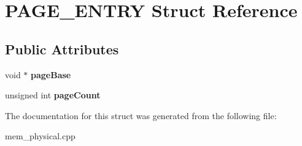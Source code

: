 \hypertarget{struct_p_a_g_e___e_n_t_r_y}{}\section{P\+A\+G\+E\+\_\+\+E\+N\+T\+RY Struct Reference}
\label{struct_p_a_g_e___e_n_t_r_y}
\subsection*{Public Attributes}
\begin{DoxyCompactItemize}
\item 
\mbox{\label{struct_p_a_g_e___e_n_t_r_y_afd46907505fa7df9ca7fd9cbd44f2448}} 
void $\ast$ {\bfseries page\+Base}
\item 
\mbox{\label{struct_p_a_g_e___e_n_t_r_y_aeb536eb5b4c6b6d43d90a73a30017094}} 
unsigned int {\bfseries page\+Count}
\end{DoxyCompactItemize}


The documentation for this struct was generated from the following file\+:\begin{DoxyCompactItemize}
\item 
mem\+\_\+physical.\+cpp\end{DoxyCompactItemize}
